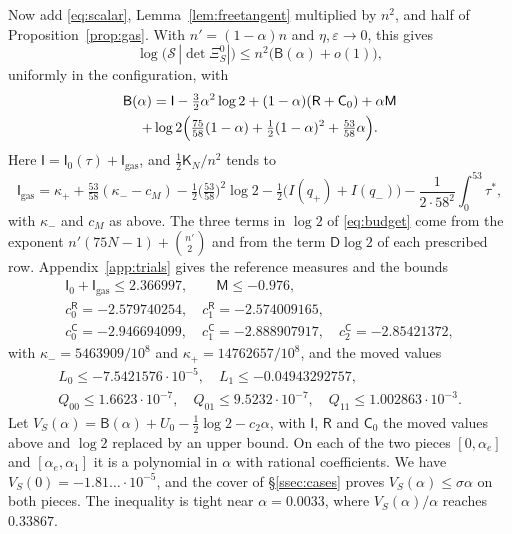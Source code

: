 Now add \eqref{eq:scalar}, Lemma~\ref{lem:freetangent} multiplied by $n^2$, and half of Proposition~\ref{prop:gas}. With $n'=(1-\alpha)n$ and $\eta,\varepsilon\to0$, this gives
\[
 \log\bigl(\mathcal S\,|\det\Xi^0_S|\bigr)\le n^2\bigl(\mathsf B(\alpha)+o(1)\bigr),
\]
uniformly in the configuration, with
\begin{multline}\label{eq:budget}
 \mathsf B(\alpha)=\mathsf I-\tfrac32\alpha^2\log2+(1-\alpha)(\mathsf R+\mathsf C_0)+\alpha\mathsf M\\
 +\log2\Bigl(\tfrac{75}{58}(1-\alpha)+\tfrac12(1-\alpha)^2+\tfrac{53}{58}\alpha\Bigr).
\end{multline}
Here $\mathsf I=\mathsf I_0(\tau)+\mathsf I_{\mathrm{gas}}$, and $\frac12\mathsf K_N/n^2$ tends to
\[
 \mathsf I_{\mathrm{gas}}=\kappa_++\tfrac{53}{58}(\kappa_--c_M)-\tfrac12\bigl(\tfrac{53}{58}\bigr)^2\log2-\tfrac12\bigl(I(q_+)+I(q_-)\bigr)-\frac1{2\cdot58^2}\int_0^{53}\tau^*,
\]
with $\kappa_-$ and $c_M$ as above. The three terms in $\log2$ of \eqref{eq:budget} come from the exponent
$n'(75N-1)+\binom{n'}2$ and from the term $\mathsf D\log2$ of each prescribed row. Appendix~\ref{app:trials} gives the reference measures and the bounds
\begin{equation}\label{eq:caps}
\begin{gathered}
 \mathsf I_0+\mathsf I_{\mathrm{gas}}\le2.366997,\qquad\mathsf M\le-0.976,\\
 c^{\mathsf R}_0=-2.579740254,\quad c^{\mathsf R}_1=-2.574009165,\\
 c^{\mathsf C}_0=-2.946694099,\quad c^{\mathsf C}_1=-2.888907917,\quad c^{\mathsf C}_2=-2.85421372,
\end{gathered}
\end{equation}
with $\kappa_-=5463909/10^8$ and $\kappa_+=14762657/10^8$, and the moved values
\begin{gather*}
 L_0\le-7.5421576\cdot10^{-5},\quad L_1\le-0.04943292757,\\
 Q_{00}\le1.6623\cdot10^{-7},\quad Q_{01}\le9.5232\cdot10^{-7},\quad Q_{11}\le1.002863\cdot10^{-3}.
\end{gather*}
Let $V_S(\alpha)=\mathsf B(\alpha)+U_0-\frac12\log2-c_2\alpha$, with $\mathsf I$, $\mathsf R$ and $\mathsf C_0$ the moved values above and $\log2$
replaced by an upper bound. On each of the two pieces $[0,\alpha_e]$ and $[\alpha_e,\alpha_1]$ it is a polynomial in $\alpha$ with rational
coefficients. We have $V_S(0)=-1.81\ldots\cdot10^{-5}$, and the cover of \S\ref{ssec:cases} proves $V_S(\alpha)\le\sigma\alpha$ on both pieces. The
inequality is tight near $\alpha=0.0033$, where $V_S(\alpha)/\alpha$ reaches $0.33867$.


